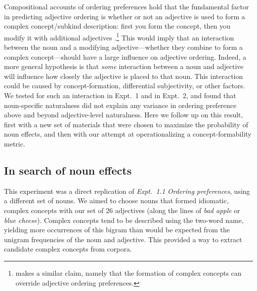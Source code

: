 \documentclass[12pt]{article}
\newcommand{\jd}[1]{\textcolor{red}{[jd: #1]}}
\begin{document}
Compositional accounts of ordering preferences hold that the fundamental factor in predicting adjective ordering is whether or not an adjective is used to form a complex concept/subkind description: first you form the concept, then you modify it with additional adjectives \citep{McNally2004,svenonius2008}.\footnote{\cite{bouchard2005} makes a similar claim, namely that the formation of complex concepts can override adjective ordering preferences.} 
This would imply that an interaction between the noun and a modifying adjective---whether they combine to form a complex concept---should have a large influence on adjective ordering. 
Indeed, a more general hypothesis is that \emph{some} interaction between a noun and adjective will influence how closely the adjective is placed to that noun. This interaction could be caused by concept-formation, differential subjectivity, or other factors. We tested for such an interaction in Expt.~1 and in Expt.~2, and found that noun-specific naturalness did not explain any variance in ordering preference above and beyond adjective-level naturalness. %
Here we follow up on this result, first with a new set of materials that were chosen to maximize the probability of noun effects, and then with our attempt at operationalizing a concept-formability metric.

\subsection{In search of noun effects}

This experiment was a direct replication of \emph{Expt.~1.1 Ordering preferences}, using a different set of nouns. We aimed to choose nouns that formed idiomatic, complex concepts with our set of 26 adjectives (along the lines of \emph{bad apple} or \emph{blue cheese}).  %
Complex concepts tend to be described using the two-word name, yielding more occurrences of this bigram than would be expected from the unigram frequencies of the noun and adjective. This provided a way to extract candidate complex concepts from corpora.
\end{document}
